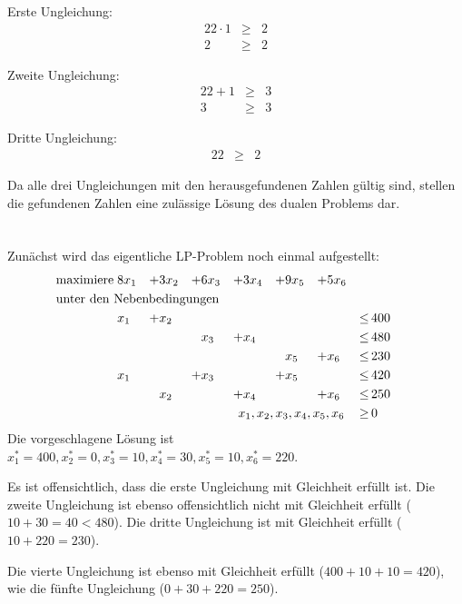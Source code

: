 \documentclass[10pt,a4paper,oneside,ngerman,numbers=noenddot]{scrartcl}
\begin{document}
		Erste Ungleichung:
		\begin{alignat*}{2}
			2 \cdot 1 &\geq & 2 \\
			2 &\geq & 2
		\end{alignat*}
		
		Zweite Ungleichung:
		\begin{alignat*}{2}
			2 + 1 &\geq & 3 \\
			3 &\geq & 3
		\end{alignat*}
		
		Dritte Ungleichung:
		\begin{alignat*}{2}
			2 &\geq & 2
		\end{alignat*}
		
		Da alle drei Ungleichungen mit den herausgefundenen Zahlen gültig sind, stellen die gefundenen Zahlen eine zulässige Lösung des dualen Problems dar.
\section{} %
	Zunächst wird das eigentliche LP-Problem noch einmal aufgestellt:
	\begin{alignat*}{7}
		\text{maximiere}\; & 8x_{1} &+& 3x_{2} &+& 6x_{3} &+& 3x_{4} &+& 9x_{5} &+& 5x_{6} &&  \\
		\multicolumn{14}{l}{\text{unter den Nebenbedingungen}} && \\
		& x_{1} &+& x_{2} && && && && &\leq &\, 400 \\
		& && && x_{3} &+& x_{4} && && &\leq &\, 480 \\
		& && && && && x_{5} &+& x_{6} &\leq &\, 230 \\
		& x_{1} && &+& x_{3} && &+& x_{5} && &\leq &\, 420 \\
		& && x_{2} && &+& x_{4} && &+& x_{6} &\leq &\, 250 \\
		\multicolumn{12}{r}{$x_{1}, x_{2}, x_{3}, x_{4}, x_{5}, x_{6}$} \,&\geq &\, 0
	\end{alignat*}
	Die vorgeschlagene Lösung ist $x_{1}^{*} = 400, x_{2}^{*} = 0, x_{3}^{*} = 10, x_{4}^{*} = 30, x_{5}^{*} = 10, x_{6}^{*} = 220$.
	
	Es ist offensichtlich, dass die erste Ungleichung mit Gleichheit erfüllt ist. Die zweite Ungleichung ist ebenso offensichtlich nicht mit Gleichheit erfüllt ($10 + 30 = 40 < 480$). Die dritte Ungleichung ist mit Gleichheit erfüllt ($10 + 220 = 230$).
	
	Die vierte Ungleichung ist ebenso mit Gleichheit erfüllt ($400 + 10 + 10 = 420$), wie die fünfte Ungleichung ($0 + 30 + 220 = 250$).
	
\end{document}

